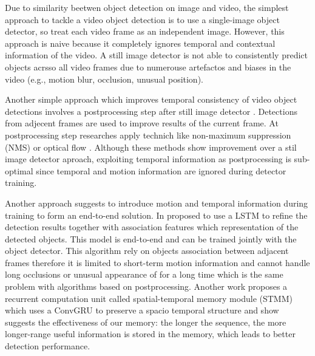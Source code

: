 
Due to similarity beetwen object detection on image and video, the simplest approach to tackle a video object detection is to use a single-image object detector, so treat each video frame as an independent image. However, this approach is naive because it completely ignores temporal and contextual information of the video. A still image detector is not able to consistently predict objects acrsso all video frames due to numerouse artefactos and biases in the video (e.g., motion blur, occlusion, unusual position).




Another simple approach which improves temporal consistency of video object detections involves a postprocessing step after still image detector \cite{hanSeqNMSVideoObject2016, kangTCNNTubeletsConvolutional2018, kangObjectDetectionVideo2016}. Detections from adjecent frames are used to improve results of the current frame. At postprocessing step researches apply technich like non-maximum suppression (NMS) \cite{hanSeqNMSVideoObject2016} or optical flow \cite{kangTCNNTubeletsConvolutional2018, kangObjectDetectionVideo2016}. Although these methods show improvement over a stil image detector aproach, exploiting temporal information as postprocessing is sub-optimal since temporal and motion information are ignored during detector training.



Another approach suggests to introduce motion and temporal information during training to form an end-to-end solution. In \cite{Lu_2017_ICCV} proposed to use a LSTM \cite{6795963} to refine the detection results together with association features which representation of the detected objects. This model is end-to-end and can be trained jointly with the object detector. This algorithm rely on objects association between adjacent frames therefore it is limited to short-term motion information and cannot handle long occlusions or unusual appearance of for a long time which is the same problem with algorithms based on postprocessing. Another work proposes a recurrent computation unit called spatial-temporal memory module (STMM) \cite{xiaoVideoObjectDetection2018} which uses a ConvGRU \cite{ballasDelvingDeeperConvolutional2016} to preserve a spacio temporal structure and show suggests the effectiveness of our memory: the longer the sequence, the more longer-range useful information is stored in the memory, which leads to better detection performance.

